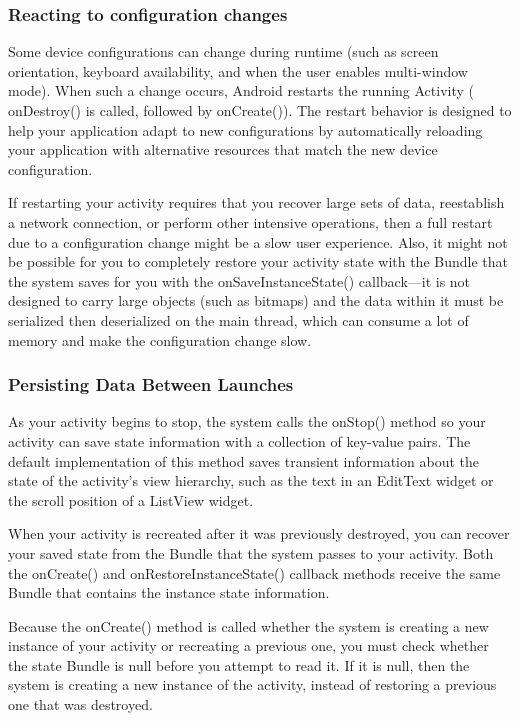\subsubsection{Reacting to configuration changes}
Some device configurations can change during runtime (such as screen orientation, keyboard availability, and when the user enables multi-window mode). When such a change occurs, Android restarts the running Activity ( onDestroy() is called, followed by onCreate()). The restart behavior is designed to help your application adapt to new configurations by automatically reloading your application with alternative resources that match the new device configuration.

If restarting your activity requires that you recover large sets of data, reestablish a network connection, or perform other intensive operations, then a full restart due to a configuration change might be a slow user experience. Also, it might not be possible for you to completely restore your activity state with the Bundle that the system saves for you with the onSaveInstanceState() callback—it is not designed to carry large objects (such as bitmaps) and the data within it must be serialized then deserialized on the main thread, which can consume a lot of memory and make the configuration change slow.

\subsubsection{Persisting Data Between Launches}
As your activity begins to stop, the system calls the onStop() method so your activity can save state information with a collection of key-value pairs. The default implementation of this method saves transient information about the state of the activity's view hierarchy, such as the text in an EditText widget or the scroll position of a ListView widget.

When your activity is recreated after it was previously destroyed, you can recover your saved state from the Bundle that the system passes to your activity. Both the onCreate() and onRestoreInstanceState() callback methods receive the same Bundle that contains the instance state information.

Because the onCreate() method is called whether the system is creating a new instance of your activity or recreating a previous one, you must check whether the state Bundle is null before you attempt to read it. If it is null, then the system is creating a new instance of the activity, instead of restoring a previous one that was destroyed.

